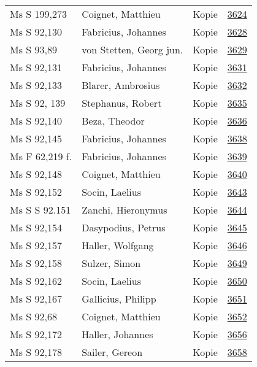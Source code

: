 \documentclass[10pt,a4paper,landscape]{report}
\begin{document}
\begin{longtable}{p{16cm}p{4cm}lr}
Ms S 199,273	&	Coignet, Matthieu	&	Kopie	&	\href{http://130.60.24.72/assignment/3624}{3624}\\
Ms S 92,130	&	Fabricius, Johannes	&	Kopie	&	\href{http://130.60.24.72/assignment/3628}{3628}\\
Ms S 93,89	&	von Stetten, Georg jun.	&	Kopie	&	\href{http://130.60.24.72/assignment/3629}{3629}\\
Ms S 92,131	&	Fabricius, Johannes	&	Kopie	&	\href{http://130.60.24.72/assignment/3631}{3631}\\
Ms S 92,133	&	Blarer, Ambrosius	&	Kopie	&	\href{http://130.60.24.72/assignment/3632}{3632}\\
Ms S 92, 139	&	Stephanus, Robert	&	Kopie	&	\href{http://130.60.24.72/assignment/3635}{3635}\\
Ms S 92,140	&	Beza, Theodor	&	Kopie	&	\href{http://130.60.24.72/assignment/3636}{3636}\\
Ms S 92,145	&	Fabricius, Johannes	&	Kopie	&	\href{http://130.60.24.72/assignment/3638}{3638}\\
Ms F 62,219 f.	&	Fabricius, Johannes	&	Kopie	&	\href{http://130.60.24.72/assignment/3639}{3639}\\
Ms S 92,148	&	Coignet, Matthieu	&	Kopie	&	\href{http://130.60.24.72/assignment/3640}{3640}\\
Ms S 92,152	&	Socin, Laelius	&	Kopie	&	\href{http://130.60.24.72/assignment/3643}{3643}\\
Ms S S 92.151	&	Zanchi, Hieronymus	&	Kopie	&	\href{http://130.60.24.72/assignment/3644}{3644}\\
Ms S 92,154	&	Dasypodius, Petrus	&	Kopie	&	\href{http://130.60.24.72/assignment/3645}{3645}\\
Ms S 92,157	&	Haller, Wolfgang	&	Kopie	&	\href{http://130.60.24.72/assignment/3646}{3646}\\
Ms S 92,158	&	Sulzer, Simon	&	Kopie	&	\href{http://130.60.24.72/assignment/3649}{3649}\\
Ms S 92,162	&	Socin, Laelius	&	Kopie	&	\href{http://130.60.24.72/assignment/3650}{3650}\\
Ms S 92,167	&	Gallicius, Philipp	&	Kopie	&	\href{http://130.60.24.72/assignment/3651}{3651}\\
Ms S 92,68	&	Coignet, Matthieu	&	Kopie	&	\href{http://130.60.24.72/assignment/3652}{3652}\\
Ms S 92,172	&	Haller, Johannes	&	Kopie	&	\href{http://130.60.24.72/assignment/3656}{3656}\\
Ms S 92,178	&	Sailer, Gereon	&	Kopie	&	\href{http://130.60.24.72/assignment/3658}{3658}\\

\end{longtable}
\end{document}
